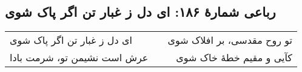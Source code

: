 \begin{center}
\section*{رباعی شمارهٔ ۱۸۶: ای دل ز غبار تن اگر پاک شوی}
\label{sec:186}
\begin{longtable}{l p{0.5cm} r}
ای دل ز غبار تن اگر پاک شوی
&&
تو روح مقدسی، بر افلاک شوی
\\
عرش است نشیمن تو، شرمت بادا
&&
کآیی و مقیم خطهٔ خاک شوی
\\
\end{longtable}
\end{center}
